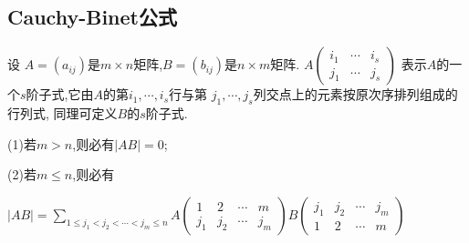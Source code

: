 \subsection{Cauchy-Binet公式}

\begin{theorem}\label{thm:Cauchy-Binet}
  设 $A=(a_{ij})$是$m \times n$矩阵,$B=(b_{ij})$是$n \times m$矩阵.
  $A\left(\begin{smallmatrix}i_1 & \cdots & i_s \\
      j_1 & \cdots & j_s \end{smallmatrix}\right)$
  表示$A$的一个$s$阶子式,它由$A$的第$i_1, \cdots, i_s$行与第
  $j_1, \cdots, j_s$列交点上的元素按原次序排列组成的行列式,
  同理可定义$B$的$s$阶子式.\par
  (1)若$m>n$,则必有$\left\vert AB \right\vert=0$;\par
  (2)若$m \le n$,则必有\par
  $|AB|= \sum\limits_{1 \le j_1<j_2<\cdots<j_m \le n}
  A\left(\begin{smallmatrix}
      1 & 2 & \cdots & m \\
      j_1 & j_2 & \cdots & j_m \end{smallmatrix}\right)
  B\left(\begin{smallmatrix}
      j_1 & j_2 & \cdots & j_m\\
      1 & 2 & \cdots & m \end{smallmatrix}\right)$

\end{theorem}

